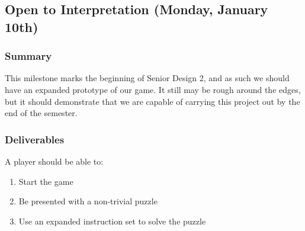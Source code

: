 \subsection{Open to Interpretation (Monday, January 10th)}

\subsubsection*{Summary}
This milestone marks the beginning of Senior Design 2, and as such we should
have an expanded prototype of our game. It still may be rough around the edges,
but it should demonstrate that we are capable of carrying this project out by
the end of the semester.

\subsubsection*{Deliverables}
A player should be able to:
\begin{enumerate}
  \item Start the game
  \item Be presented with a non-trivial puzzle
  \item Use an expanded instruction set to solve the puzzle
\end{enumerate}

